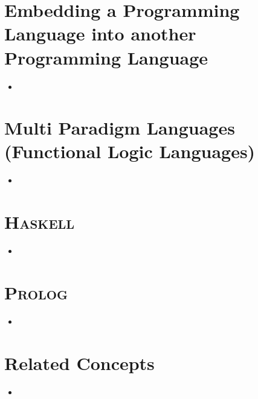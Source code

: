 \documentclass{beamer}
\newcommand{\progLang}[1]{\textsc{#1}}
\begin{document}
\section{Embedding a Programming Language into another Programming Language}
\begin{frame}
\begin{itemize}
\item
\end{itemize}

\end{frame}


\clearpage

\section{Multi Paradigm Languages (Functional Logic Languages)}
\begin{frame}
\begin{itemize}
\item
\end{itemize}

\end{frame}


\clearpage

\section{\progLang{Haskell}}
\begin{frame}
\begin{itemize}
\item
\end{itemize}

\end{frame}


\clearpage

\section{\progLang{Prolog}}
\begin{frame}
\begin{itemize}
\item
\end{itemize}

\end{frame}


\clearpage

\section{Related Concepts}
\begin{frame}
\begin{itemize}
\item
\end{itemize}

\end{frame}
\end{document}
